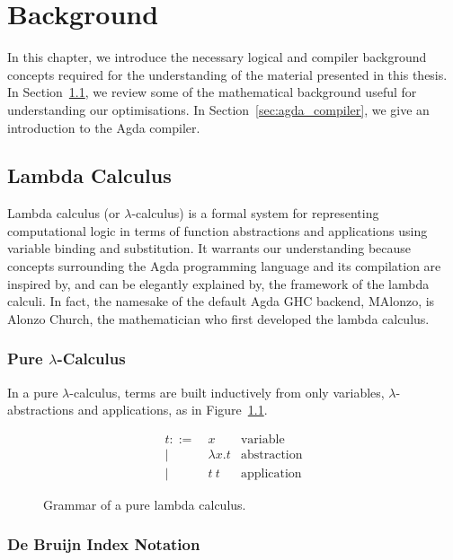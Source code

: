 \chapter{Background}
\label{cha:background}

In this chapter, we introduce the necessary logical and compiler background concepts required for the understanding of the material presented in this thesis. In Section~\ref{sec:lambda_calc}, we review some of the mathematical background useful for understanding our optimisations. In Section~\ref{sec:agda_compiler}, we give an introduction to the Agda compiler.

\section{Lambda Calculus}
\label{sec:lambda_calc}

Lambda calculus (or $\lambda$-calculus) is a formal system for representing computational logic in terms of function abstractions and applications using variable binding and substitution. It warrants our understanding because concepts surrounding the Agda programming language and its compilation are inspired by, and can be elegantly explained by, the framework of the lambda calculi.\cite{fokkinga1987} In fact, the namesake of the default Agda GHC backend, MAlonzo, is Alonzo Church, the mathematician who first developed the lambda calculus.\cite{fokkinga1987}

\subsection{Pure $\lambda$-Calculus}

In a pure $\lambda$-calculus, terms are built inductively from only variables, $\lambda$-abstractions and applications, as in Figure~\ref{fig:lambda_calc}.\cite{kozen1997}

\begin{figure}[h]
\begin{align*}
t ::=~& x               & \text{variable}\\
    |~& \lambda x . t   & \text{abstraction}\\
    |~& t~t             & \text{application}
\end{align*}
\caption{Grammar of a pure lambda calculus.}
\label{fig:lambda_calc}
\end{figure}

\subsection{De Bruijn Index Notation}

